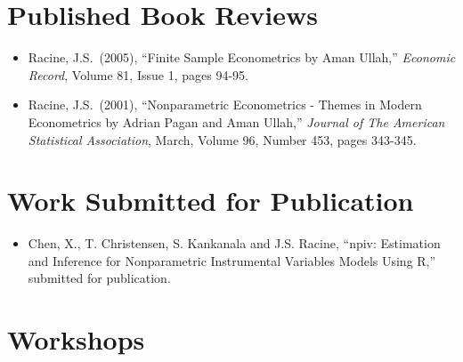 \documentclass[
]{article}
\providecommand{\tightlist}{%
  \setlength{\itemsep}{0pt}\setlength{\parskip}{0pt}}
\begin{document}
\section*{Published Book Reviews}\label{published-book-reviews}

\begin{itemize}
\item
  Racine, J.S.~(2005), ``Finite Sample Econometrics by Aman Ullah,''
  \emph{Economic Record}, Volume 81, Issue 1, pages 94-95.
\item
  Racine, J.S.~(2001), ``Nonparametric Econometrics - Themes in Modern
  Econometrics by Adrian Pagan and Aman Ullah,'' \emph{Journal of The
  American Statistical Association}, March, Volume 96, Number 453, pages
  343-345.
\end{itemize}

\section*{Work Submitted for
Publication}\label{work-submitted-for-publication}

\begin{itemize}
\tightlist
\item
  Chen, X., T. Christensen, S. Kankanala and J.S. Racine, ``npiv:
  Estimation and Inference for Nonparametric Instrumental Variables
  Models Using R,'' submitted for publication.
\end{itemize}

\section*{Workshops}\label{workshops}
\end{document}
